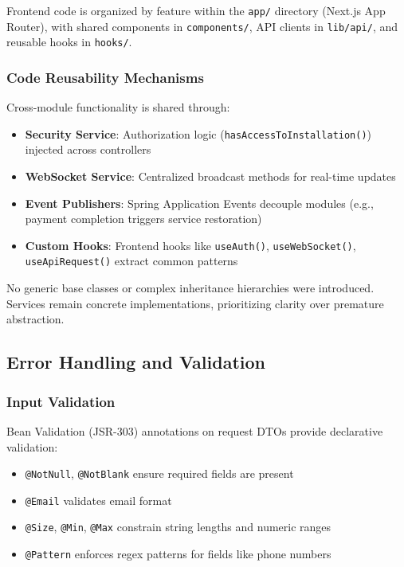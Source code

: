 Frontend code is organized by feature within the \texttt{app/} directory (Next.js App Router), with shared components in \texttt{components/}, API clients in \texttt{lib/api/}, and reusable hooks in \texttt{hooks/}.

\subsubsection{Code Reusability Mechanisms}
\label{subsubsec:code-reusability}

Cross-module functionality is shared through:
\begin{itemize}
    \item \textbf{Security Service}: Authorization logic (\texttt{hasAccessToInstallation()}) injected across controllers
    \item \textbf{WebSocket Service}: Centralized broadcast methods for real-time updates
    \item \textbf{Event Publishers}: Spring Application Events decouple modules (e.g., payment completion triggers service restoration)
    \item \textbf{Custom Hooks}: Frontend hooks like \texttt{useAuth()}, \texttt{useWebSocket()}, \texttt{useApiRequest()} extract common patterns
\end{itemize}

No generic base classes or complex inheritance hierarchies were introduced. Services remain concrete implementations, prioritizing clarity over premature abstraction.

\subsection{Error Handling and Validation}
\label{subsec:error-handling}

\subsubsection{Input Validation}
\label{subsubsec:validation-strategy}

Bean Validation (JSR-303) annotations on request DTOs provide declarative validation:
\begin{itemize}
    \item \texttt{@NotNull}, \texttt{@NotBlank} ensure required fields are present
    \item \texttt{@Email} validates email format
    \item \texttt{@Size}, \texttt{@Min}, \texttt{@Max} constrain string lengths and numeric ranges
    \item \texttt{@Pattern} enforces regex patterns for fields like phone numbers
\end{itemize}


